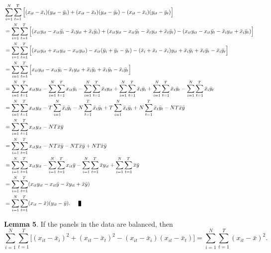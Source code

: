 \documentclass{article}[12pt]
\newenvironment{proof}[1][Proof.]{\begin{trivlist}
\item[\hskip \labelsep {\bfseries #1}]}{\end{trivlist}}
\newcommand{\qed}{\nobreak \ifvmode \relax \else
      \ifdim\lastskip<1.5em \hskip-\lastskip
      \hskip1.5em plus0em minus0.5em \fi \nobreak
      \vrule height0.75em width0.5em depth0.25em\fi}
\begin{document}
\begin{proof}
\begin{align}
& \sum_{i=1}^N \sum_{t=1}^T\Big[(x_{it}  - \bar{x}_i)(y_{it} - \bar{y}_i) + (x_{it}  - \bar{x}_t)(y_{it} - \bar{y}_t) - (x_{it}  - \bar{x}_i)(y_{it} - \bar{y}_t)\Big]\nonumber\\
& = \sum_{i=1}^N \sum_{t=1}^T\Big[(x_{it}y_{it} - x_{it}\bar{y}_i  - \bar{x}_iy_{it} + \bar{x}_i\bar{y}_i)+(x_{it}y_{it} - x_{it}\bar{y}_t  - \bar{x}_ty_{it} + \bar{x}_t\bar{y}_t) - (x_{it}y_{it} - x_{it}\bar{y}_t  - \bar{x}_iy_{it} + \bar{x}_i\bar{y}_t)\Big]\nonumber\\
& = \sum_{i=1}^N \sum_{t=1}^T\Big[(x_{it}y_{it}  +x_{it}y_{it} - x_{it}y_{it}) -  x_{it}(\bar{y}_i  + \bar{y}_t  - \bar{y}_t )  -(\bar{x}_i + \bar{x}_t - \bar{x}_i)y_{it}+ \bar{x}_i\bar{y}_i + \bar{x}_t\bar{y}_t - \bar{x}_i\bar{y}_t\Big]\nonumber\\
& = \sum_{i=1}^N \sum_{t=1}^T \Big[x_{it}y_{it} -  x_{it}\bar{y}_i  -\bar{x}_ty_{it}+ \bar{x}_i\bar{y}_i + \bar{x}_t\bar{y}_t - \bar{x}_i\bar{y}_t\Big]\nonumber\\
& = \sum_{i=1}^N \sum_{t=1}^T x_{it}y_{it} -  \sum_{i=1}^N \sum_{t=1}^Tx_{it}\bar{y}_i  -\sum_{i=1}^N \sum_{t=1}^T\bar{x}_ty_{it}+ \sum_{i=1}^N \sum_{t=1}^T\bar{x}_i\bar{y}_i + \sum_{i=1}^N \sum_{t=1}^T\bar{x}_t\bar{y}_t - \sum_{i=1}^N \sum_{t=1}^T\bar{x}_i\bar{y}_t\nonumber\\
& = \sum_{i=1}^N \sum_{t=1}^T x_{it}y_{it} -  T\sum_{i=1}^N \bar{x}_i\bar{y}_i  -N\sum_{t=1}^T\bar{x}_t\bar{y}_t+ T\sum_{i=1}^N \bar{x}_i\bar{y}_i + N\sum_{t=1}^T\bar{x}_t\bar{y}_t - NT\bar{x}\bar{y}\nonumber\\
& = \sum_{i=1}^N \sum_{t=1}^T x_{it}y_{it} - NT\bar{x}\bar{y}\nonumber\\
& = \sum_{i=1}^N \sum_{t=1}^T x_{it}y_{it} - NT\bar{x}\bar{y} - NT\bar{x}\bar{y} + NT\bar{x}\bar{y}\nonumber\\
& = \sum_{i=1}^N \sum_{t=1}^T x_{it}y_{it} - \sum_{i=1}^N \sum_{t=1}^Tx_{it}\bar{y}  - \sum_{i=1}^N \sum_{t=1}^T\bar{x}y_{it} + \sum_{i=1}^N \sum_{t=1}^T\bar{x}\bar{y}\nonumber\\
& = \sum_{i=1}^N \sum_{t=1}^T(x_{it}y_{it} - x_{it}\bar{y}  - \bar{x}y_{it} + \bar{x}\bar{y})\nonumber\\
& = \sum_{i=1}^N \sum_{t=1}^T(x_{it}  - \bar{x})(y_{it} - \bar{y}). \qed
\end{align}
\end{proof}
\textbf{Lemma 5}. If the panels in the data are balanced, then
\begin{equation}
\sum_{i=1}^N \sum_{t=1}^T\Big[(x_{it}  - \bar{x}_i)^2 + (x_{it} - \bar{x}_t)^2 - (x_{it}  - \bar{x}_i)(x_{it} - \bar{x}_t)\Big]  = \sum_{i=1}^N \sum_{t=1}^T(x_{it}  - \bar{x})^2.
\end{equation}
\end{document}

